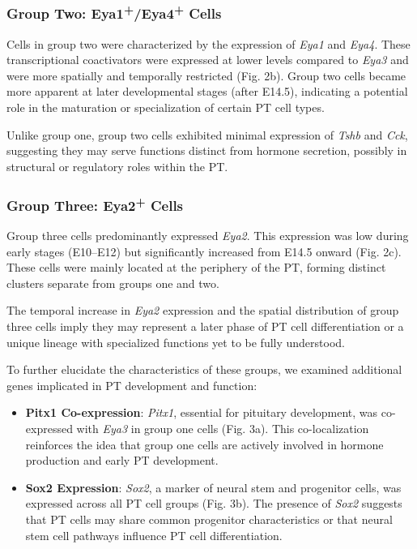 \documentclass[
  number,
  preprint]{elsarticle}
\providecommand{\tightlist}{%
  \setlength{\itemsep}{0pt}\setlength{\parskip}{0pt}}\usepackage{longtable,booktabs,array}
\begin{document}
\subsubsection{\texorpdfstring{\textbf{Group Two:
Eya1\textsuperscript{+}/Eya4\textsuperscript{+}
Cells}}{Group Two: Eya1+/Eya4+ Cells}}\label{group-two-eya1eya4-cells}

Cells in group two were characterized by the expression of \emph{Eya1}
and \emph{Eya4}. These transcriptional coactivators were expressed at
lower levels compared to \emph{Eya3} and were more spatially and
temporally restricted (Fig. 2b). Group two cells became more apparent at
later developmental stages (after E14.5), indicating a potential role in
the maturation or specialization of certain PT cell types.

Unlike group one, group two cells exhibited minimal expression of
\emph{Tshb} and \emph{Cck}, suggesting they may serve functions distinct
from hormone secretion, possibly in structural or regulatory roles
within the PT.

\subsubsection{\texorpdfstring{\textbf{Group Three:
Eya2\textsuperscript{+}
Cells}}{Group Three: Eya2+ Cells}}\label{group-three-eya2-cells}

Group three cells predominantly expressed \emph{Eya2}. This expression
was low during early stages (E10--E12) but significantly increased from
E14.5 onward (Fig. 2c). These cells were mainly located at the periphery
of the PT, forming distinct clusters separate from groups one and two.

The temporal increase in \emph{Eya2} expression and the spatial
distribution of group three cells imply they may represent a later phase
of PT cell differentiation or a unique lineage with specialized
functions yet to be fully understood.

To further elucidate the characteristics of these groups, we examined
additional genes implicated in PT development and function:

\begin{itemize}
\tightlist
\item
  \textbf{Pitx1 Co-expression}: \emph{Pitx1}, essential for pituitary
  development, was co-expressed with \emph{Eya3} in group one cells
  (Fig. 3a). This co-localization reinforces the idea that group one
  cells are actively involved in hormone production and early PT
  development.
\item
  \textbf{Sox2 Expression}: \emph{Sox2}, a marker of neural stem and
  progenitor cells, was expressed across all PT cell groups (Fig. 3b).
  The presence of \emph{Sox2} suggests that PT cells may share common
  progenitor characteristics or that neural stem cell pathways influence
  PT cell differentiation.
\end{itemize}
\end{document}
